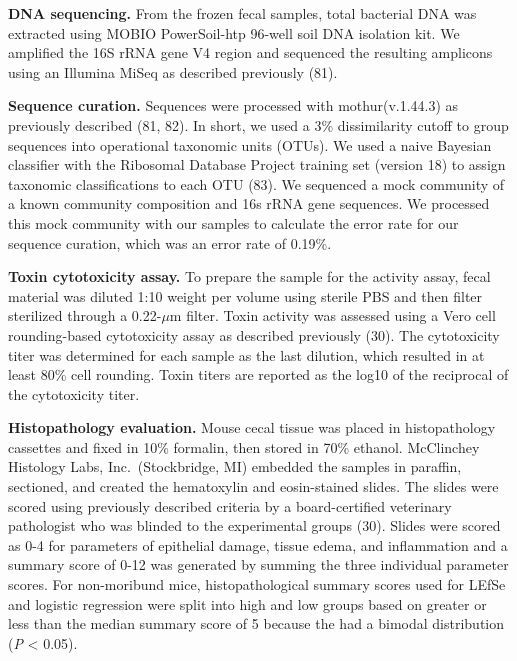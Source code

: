 \documentclass[
  12pt,
]{article}
\begin{document}
\textbf{DNA sequencing.} From the frozen fecal samples, total bacterial
DNA was extracted using MOBIO PowerSoil-htp 96-well soil DNA isolation
kit. We amplified the 16S rRNA gene V4 region and sequenced the
resulting amplicons using an Illumina MiSeq as described previously
(81).

\textbf{Sequence curation.} Sequences were processed with
mothur(v.1.44.3) as previously described (81, 82). In short, we used a
3\% dissimilarity cutoff to group sequences into operational taxonomic
units (OTUs). We used a naive Bayesian classifier with the Ribosomal
Database Project training set (version 18) to assign taxonomic
classifications to each OTU (83). We sequenced a mock community of a
known community composition and 16s rRNA gene sequences. We processed
this mock community with our samples to calculate the error rate for our
sequence curation, which was an error rate of 0.19\%.

\textbf{Toxin cytotoxicity assay.} To prepare the sample for the
activity assay, fecal material was diluted 1:10 weight per volume using
sterile PBS and then filter sterilized through a 0.22-\(\mu\)m filter.
Toxin activity was assessed using a Vero cell rounding-based
cytotoxicity assay as described previously (30). The cytotoxicity titer
was determined for each sample as the last dilution, which resulted in
at least 80\% cell rounding. Toxin titers are reported as the log10 of
the reciprocal of the cytotoxicity titer.

\textbf{Histopathology evaluation.} Mouse cecal tissue was placed in
histopathology cassettes and fixed in 10\% formalin, then stored in 70\%
ethanol. McClinchey Histology Labs, Inc.~(Stockbridge, MI) embedded the
samples in paraffin, sectioned, and created the hematoxylin and
eosin-stained slides. The slides were scored using previously described
criteria by a board-certified veterinary pathologist who was blinded to
the experimental groups (30). Slides were scored as 0-4 for parameters
of epithelial damage, tissue edema, and inflammation and a summary score
of 0-12 was generated by summing the three individual parameter scores.
For non-moribund mice, histopathological summary scores used for LEfSe
and logistic regression were split into high and low groups based on
greater or less than the median summary score of 5 because the had a
bimodal distribution (\emph{P} \textless{} 0.05).
\end{document}
